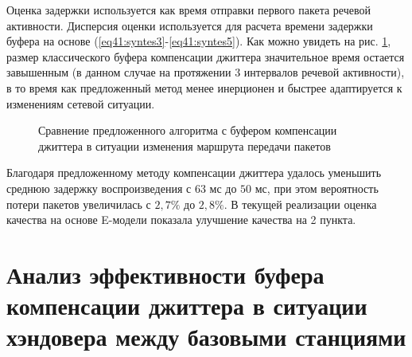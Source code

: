 Оценка задержки используется как время отправки первого пакета речевой активности.
Дисперсия оценки используется для расчета времени задержки буфера на основе (\ref{eq41:syntes3}-\ref{eq41:syntes5}).
Как можно увидеть на рис. \ref{img4:routeBuff}, размер классического буфера компенсации джиттера значительное время остается завышенным (в данном случае на протяжении 3 интервалов речевой активности),
в то время как предложенный метод менее инерционен и быстрее адаптируется к изменениям сетевой ситуации.

\pgfplotsset{width=15cm, height=10cm, compat=1.3}
\begin{figure} [!ht]
  \center
{}
\caption{Сравнение предложенного алгоритма с буфером компенсации джиттера \cite{Ramjee} в ситуации изменения маршрута передачи пакетов}
  \label{img4:routeBuff}
\end{figure}





Благодаря предложенному методу компенсации джиттера удалось уменьшить среднюю задержку воспроизведения с $63$ мс до $50$ мс, при этом вероятность потери пакетов увеличилась с $2{,}7\%$ до $2{,}8\%$.
В текущей реализации оценка качества на основе E-модели показала улучшение качества на 2 пункта.












\section{Анализ эффективности буфера компенсации джиттера в ситуации хэндовера между базовыми станциями} \label{sect4}

